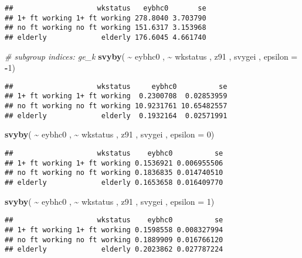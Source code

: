 \documentclass[
]{book}
\newenvironment{Shaded}{\begin{snugshade}}{\end{snugshade}}
\newcommand{\AttributeTok}[1]{\textcolor[rgb]{0.13,0.29,0.53}{#1}}
\newcommand{\CommentTok}[1]{\textcolor[rgb]{0.56,0.35,0.01}{\textit{#1}}}
\newcommand{\DecValTok}[1]{\textcolor[rgb]{0.00,0.00,0.81}{#1}}
\newcommand{\FunctionTok}[1]{\textcolor[rgb]{0.13,0.29,0.53}{\textbf{#1}}}
\newcommand{\NormalTok}[1]{#1}
\newcommand{\SpecialCharTok}[1]{\textcolor[rgb]{0.81,0.36,0.00}{\textbf{#1}}}
\begin{document}
\begin{verbatim}
##                    wkstatus   eybhc0       se
## 1+ ft working 1+ ft working 278.8040 3.703790
## no ft working no ft working 151.6317 3.153968
## elderly             elderly 176.6045 4.661740
\end{verbatim}

\begin{Shaded}
\begin{Highlighting}[]
\CommentTok{\# subgroup indices: ge\_k}
\FunctionTok{svyby}\NormalTok{( }\SpecialCharTok{\textasciitilde{}}\NormalTok{ eybhc0 , }\SpecialCharTok{\textasciitilde{}}\NormalTok{ wkstatus , z91 , svygei , }\AttributeTok{epsilon =} \SpecialCharTok{{-}}\DecValTok{1}\NormalTok{)}
\end{Highlighting}
\end{Shaded}

\begin{verbatim}
##                    wkstatus     eybhc0          se
## 1+ ft working 1+ ft working  0.2300708  0.02853959
## no ft working no ft working 10.9231761 10.65482557
## elderly             elderly  0.1932164  0.02571991
\end{verbatim}

\begin{Shaded}
\begin{Highlighting}[]
\FunctionTok{svyby}\NormalTok{( }\SpecialCharTok{\textasciitilde{}}\NormalTok{ eybhc0 , }\SpecialCharTok{\textasciitilde{}}\NormalTok{ wkstatus , z91 , svygei , }\AttributeTok{epsilon =} \DecValTok{0}\NormalTok{)}
\end{Highlighting}
\end{Shaded}

\begin{verbatim}
##                    wkstatus    eybhc0          se
## 1+ ft working 1+ ft working 0.1536921 0.006955506
## no ft working no ft working 0.1836835 0.014740510
## elderly             elderly 0.1653658 0.016409770
\end{verbatim}

\begin{Shaded}
\begin{Highlighting}[]
\FunctionTok{svyby}\NormalTok{( }\SpecialCharTok{\textasciitilde{}}\NormalTok{ eybhc0 , }\SpecialCharTok{\textasciitilde{}}\NormalTok{ wkstatus , z91 , svygei , }\AttributeTok{epsilon =} \DecValTok{1}\NormalTok{)}
\end{Highlighting}
\end{Shaded}

\begin{verbatim}
##                    wkstatus    eybhc0          se
## 1+ ft working 1+ ft working 0.1598558 0.008327994
## no ft working no ft working 0.1889909 0.016766120
## elderly             elderly 0.2023862 0.027787224
\end{verbatim}
\end{document}
